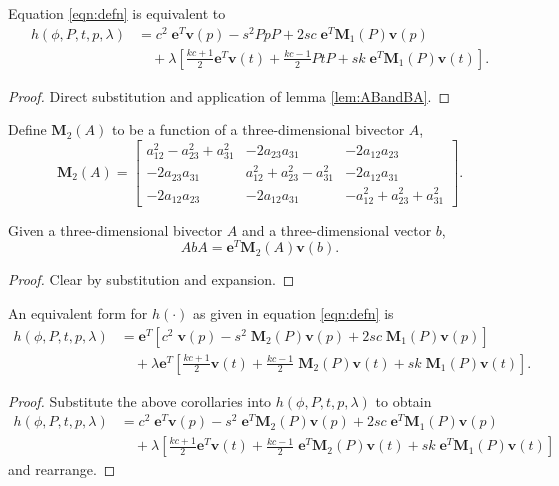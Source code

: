 \begin{cor}
Equation \ref{eqn:defn} is equivalent to
\begin{align*}
h(\phi, P, t, p, \lambda) &= c^2\;\mathbf{e}^T\mathbf{v}(p) - s^2PpP + 2sc\;\mathbf{e}^T\mathbf{M}_1(P)\mathbf{v}(p) \\
&\quad+ \lambda\left[ 
 \frac{kc+1}{2} \mathbf{e}^T\mathbf{v}(t) + \frac{kc-1}{2} PtP
+ sk\;\mathbf{e}^T\mathbf{M}_1(P)\mathbf{v}(t)
\right].
\end{align*}
\begin{proof}
Direct substitution and application of lemma \ref{lem:ABandBA}.
\end{proof}
\end{cor}

\begin{definition}
Define $\mathbf{M}_2(A)$ to be a function of a three-dimensional bivector $A$,
\[
\mathbf{M}_2(A)  =
\left[
\begin{array}{ccc}
a^2_{12} - a^2_{23} + a^2_{31} &  - 2a_{23}a_{31} & - 2a_{12}a_{23} \\
- 2a_{23}a_{31} & a^2_{12} + a^2_{23} - a^2_{31} & - 2a_{12}a_{31}  \\
- 2a_{12}a_{23} & - 2a_{12}a_{31} &  -a^2_{12} + a^2_{23} + a^2_{31} 
\end{array}
\right].
\]
\end{definition}

\begin{cor}
Given a three-dimensional bivector $A$ and a three-dimensional vector $b$,
\[
AbA = \mathbf{e}^T \mathbf{M}_2(A) \mathbf{v}(b).
\]
\begin{proof}
Clear by substitution and expansion.
\end{proof}
\end{cor}

\begin{lemma}
\label{lem:finalh}
An equivalent form for $h(\cdot)$ as given in equation \ref{eqn:defn} is
\begin{align*}
h(\phi, P, t, p, \lambda) &= 
\mathbf{e}^T \left[ 
 c^2\;\mathbf{v}(p) - s^2\;\mathbf{M}_2(P)\mathbf{v}(p) + 2sc\;\mathbf{M}_1(P)\mathbf{v}(p) 
\right] \\
&\quad+ \lambda\mathbf{e}^T\left[ 
 \frac{kc+1}{2} \mathbf{v}(t) + \frac{kc-1}{2} \;\mathbf{M}_2(P)\mathbf{v}(t)
+ sk\;\mathbf{M}_1(P)\mathbf{v}(t)
 \right].
\end{align*}
\begin{proof}
Substitute the above corollaries into $h(\phi, P, t, p,\lambda)$ to obtain
\begin{align*}
h(\phi, P, t, p, \lambda) &= 
c^2\;\mathbf{e}^T\mathbf{v}(p) - s^2\;\mathbf{e}^T\mathbf{M}_2(P)\mathbf{v}(p) + 2sc\;\mathbf{e}^T\mathbf{M}_1(P)\mathbf{v}(p) \\
&\quad+ \lambda\left[ 
 \frac{kc+1}{2} \mathbf{e}^T\mathbf{v}(t) + \frac{kc-1}{2} \;\mathbf{e}^T\mathbf{M}_2(P)\mathbf{v}(t)
+ sk\;\mathbf{e}^T\mathbf{M}_1(P)\mathbf{v}(t)
 \right]
\end{align*}
and rearrange.
\end{proof}
\end{lemma}


